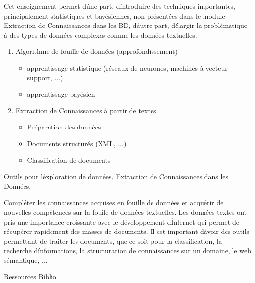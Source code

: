 \vfill

{
Cet enseignement permet d\'une part, d\'introduire des techniques importantes, principalement statistiques et bayésiennes,
non présentées dans le module Extraction de Connaissances dans les BD, d\'autre part, d\'élargir la problématique à des
types de données complexes comme les données textuelles.
\begin{enumerate}
\item Algorithme de fouille de données (approfondissement)
  \begin{itemize}
  \item apprentissage statistique (réseaux de neurones, machines à vecteur support, ...)
  \item apprentissage bayésien
  \end{itemize}
\item Extraction de Connaissances à partir de textes 
  \begin{itemize}
  \item Préparation des données
  \item Documents structurés (XML, ...)
  \item Classification de documents 
  \end{itemize}
\end{enumerate}
} 
{Outils pour l\'exploration de données, Extraction de Connaissances dans les Données.} 
{\begin{itemize}
\ObjItem Compléter les connaissances acquises en fouille de données et acquérir de nouvelles compétences sur la fouile de données textuelles. 
\ObjItem Les données textes ont pris une importance croissante avec le développement d\'Internet qui permet de récupérer rapidement des masses de documents.
\ObjItem Il est important d\'avoir des outils permettant de traiter les documents, que ce soit pour la classification,
la recherche d\'informations, la structuration de connaissances sur un domaine, le web sémantique, ...
\end{itemize} 
} 
{Ressources} 
{Biblio} 
 

